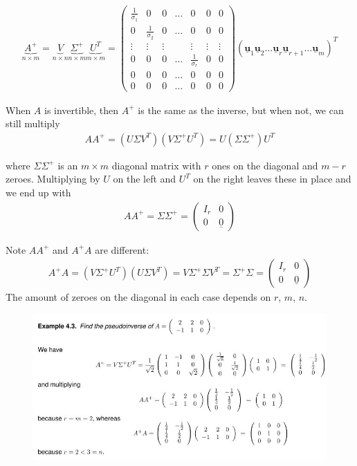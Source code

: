 \documentclass[10pt,a4paper]{article}
\begin{document}
\begin{align*}
    \underbrace{A^{+}}_{n \times m}=\underbrace{V}_{n \times n} \underbrace{\Sigma^{+}}_{n \times m} \underbrace{U^{T}}_{m \times m}=\left(\begin{array}{ccccccc}
        \frac{1}{\sigma_{1}} & 0 & 0 & \ldots & 0 & 0 & 0 \\
        0 & \frac{1}{\sigma_{2}} & 0 & \ldots & 0 & 0 & 0 \\
        \vdots & \vdots & \vdots & & \vdots & \vdots & \vdots \\
        0 & 0 & 0 & \ldots & \frac{1}{\sigma_{r}} & 0 & 0 \\
        0 & 0 & 0 & \ldots & 0 & 0 & 0 \\
        0 & 0 & 0 & \ldots & 0 & 0 & 0
        \end{array}\right)\left(\underline{\mathbf{u}}_{1} \underline{\mathbf{u}}_{2} \ldots \underline{\mathbf{u}}_{r} \underline{\mathbf{u}}_{r+1} \ldots \underline{\mathbf{u}}_{m}\right)^{T}
\end{align*}

When $A$ is invertible, then $A^+$ is the same as the inverse, but when not, we can still multiply
\begin{align*}
    A A^{+}=\left(U \Sigma V^{T}\right)\left(V \Sigma^{+} U^{T}\right)=U\left(\Sigma \Sigma^{+}\right) U^{T}
\end{align*}

where $\Sigma \Sigma ^+$ is an $m \times m$ diagonal matrix with $r$ ones on the diagonal and $m -
r$ zeroes. Multiplying by $U$ on the left and $U^T$ on the right leaves these in place and we end
up with
\begin{align*}
    A A^{+}=\Sigma \Sigma^{+}=\left(\begin{array}{cc}
        I_{r} & 0 \\
        0 & \underline{0}
        \end{array}\right)
\end{align*}

Note $AA^+$ and $A^+A$ are different:
\begin{align*}
    A^{+} A=\left(V \Sigma^{+} U^{T}\right)\left(U \Sigma V^{T}\right)=V \Sigma^{+} \Sigma V^{T}=\Sigma^{+} \Sigma=\left(\begin{array}{cc}
        I_{r} & 0 \\
        0 & \underline{0}
        \end{array}\right)
\end{align*}
The amount of zeroes on the diagonal in each case depends on $r$, $m$, $n$.

\begin{figure} [h!]
    \centering
    \includegraphics[scale=0.6]{5.JPG}
\end{figure}


\end{document}
